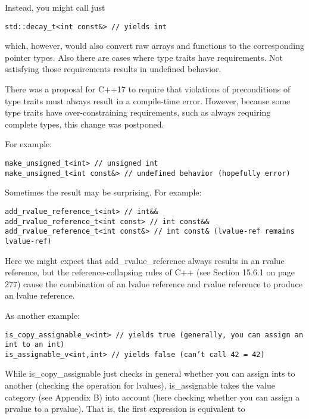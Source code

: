 Instead, you might call just

\begin{lstlisting}[style=styleCXX]
std::decay_t<int const&> // yields int
\end{lstlisting}

which, however, would also convert raw arrays and functions to the corresponding pointer types. Also there are cases where type traits have requirements. Not satisfying those requirements results in undefined behavior.

\begin{tcolorbox}[colback=webgreen!5!white,colframe=webgreen!75!black]
\hspace*{0.75cm}There was a proposal for C++17 to require that violations of preconditions of type traits must always result in a compile-time error. However, because some type traits have over-constraining requirements, such as always requiring complete types, this change was postponed.
\end{tcolorbox}

For example:

\begin{lstlisting}[style=styleCXX]
make_unsigned_t<int> // unsigned int
make_unsigned_t<int const&> // undefined behavior (hopefully error)
\end{lstlisting}

Sometimes the result may be surprising. For example:

\begin{lstlisting}[style=styleCXX]
add_rvalue_reference_t<int> // int&&
add_rvalue_reference_t<int const> // int const&&
add_rvalue_reference_t<int const&> // int const& (lvalue-ref remains lvalue-ref)
\end{lstlisting}

Here we might expect that add\_rvalue\_reference always results in an rvalue reference, but the reference-collapsing rules of C++ (see Section 15.6.1 on page 277) cause the combination of an lvalue reference and rvalue reference to produce an lvalue reference.

As another example:

\begin{lstlisting}[style=styleCXX]
is_copy_assignable_v<int> // yields true (generally, you can assign an int to an int)
is_assignable_v<int,int> // yields false (can’t call 42 = 42)
\end{lstlisting}

While is\_copy\_assignable just checks in general whether you can assign ints to another (checking the operation for lvalues), is\_assignable takes the value category (see Appendix B) into account (here checking whether you can assign a prvalue to a prvalue). That is, the first expression is equivalent to

